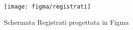 \begin{figure}[!h] 
    \centering 
    \texttt{[image: figma/registrati]} 
    \caption{Schermata Registrati progettata in Figma}
    \label{fig:registratifigma}
\end{figure}

\newpage

